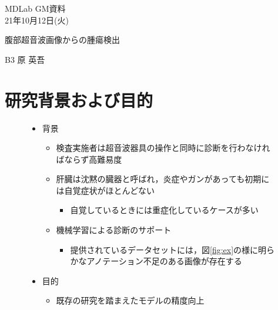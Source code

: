 \documentclass[a4j]{ujarticle}
\newcommand{\Fref}[1]{\mbox{図\ref{fig:#1}}}
\begin{document}
	\begin{flushright}
		MDLab GM資料\\
		21年10月12日(火)
	\end{flushright}

	\begin{center}
		{\Large	腹部超音波画像からの腫瘍検出}
	\end{center}

	\begin{flushright}
		{\large B3  原 英吾}\\
	\end{flushright}

	\section{研究背景および目的}
        \begin{figure}[h]
            \begin{minipage}{.59\textwidth}
                \begin{itemize}
                    \item 背景
                    \begin{itemize}
                        \item 検査実施者は超音波器具の操作と同時に診断を行わなければならず高難易度
                        \item 肝臓は沈黙の臓器と呼ばれ，炎症やガンがあっても初期には自覚症状がほとんどない
                        \begin{itemize}
                            \item 自覚しているときには重症化しているケースが多い
                        \end{itemize}
                        \item 機械学習による診断のサポート
                        \begin{itemize}
                            \item 提供されているデータセットには，\Fref{ex}の様に明らかなアノテーション不足のある画像が存在する
                        \end{itemize}
                    \end{itemize}
                    \item 目的
                    \begin{itemize}
                        \item 既存の研究を踏まえたモデルの精度向上
                        \begin{itemize}

\end{itemize}
\end{itemize}
\end{itemize}
\end{minipage}
\end{figure}
\end{document}

